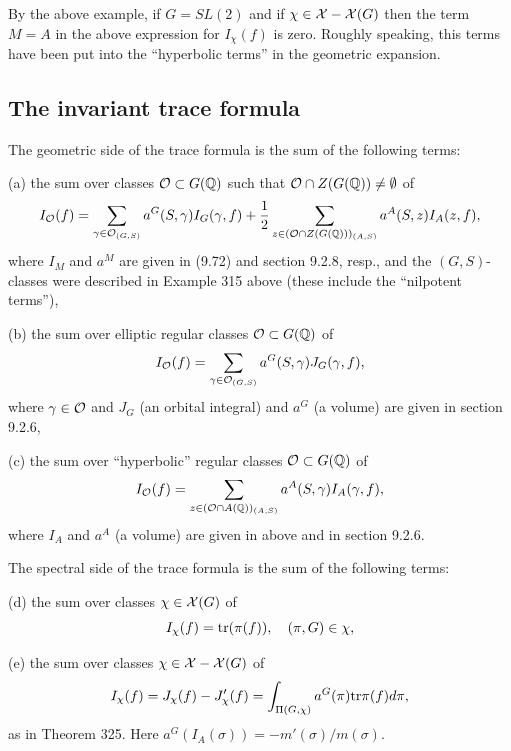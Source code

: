 By the above example, if $G=SL(2)$ and if
$\chi\in {\cal X}-{\cal X}(G)$ then the term $M=A$ in
the above expression for $I_\chi (f)$ is zero. Roughly speaking,
this terms have been put into the ``hyperbolic terms'' in
the geometric expansion.
 
\subsection{The invariant trace formula}

The geometric side of the trace formula is the sum of the following terms:

(a) the sum over classes ${\cal{O}}\subset G({\Bbb{Q}})$
such that ${\cal{O}}\cap Z(G({\Bbb{Q}}))
\not= \emptyset$ of
\begin{equation}
I_{\cal{O}}(f)=\sum_{\gamma\in {\cal{O}}_{(G,S)}}
a^G(S,\gamma)I_G(\gamma,f)
+{1\over 2}\sum_{z\in ({\cal{O}}\cap Z(G({\Bbb{Q}})))_{(A,S)}}
a^A(S,z)I_A(z,f),
\end{equation}
where $I_M$ and $a^M$ are given in (9.72) and section 9.2.8,
resp., and the $(G,S)$-classes were described in Example 315
above (these include the ``nilpotent terms''),

(b) the sum over elliptic regular classes 
${\cal{O}}\subset G({\Bbb{Q}})$
of
\begin{equation}
I_{\cal{O}}(f)=
\sum_{\gamma\in {\cal{O}}_{(G,S)}}
a^G(S,\gamma)J_G(\gamma,f),
\end{equation}
where $\gamma\in {\cal{O}}$ and
$J_G$ (an orbital integral) and $a^G$ (a volume)
are given in section 9.2.6,

(c) the sum over ``hyperbolic'' regular classes
${\cal{O}}\subset G({\Bbb{Q}})$
of
\begin{equation}
I_{\cal{O}}(f)=
\sum_{z\in ({\cal{O}}\cap A({\Bbb{Q}}))_{(A,S)}}
a^A(S,\gamma)I_A(\gamma,f),
\end{equation}
where $I_A$ and $a^A$ (a volume)
are given in above and in section 9.2.6.

The spectral side of the trace formula is the sum of the following terms:

(d) the sum over classes $\chi\in {\cal{X}}(G)$ of
\begin{equation}
I_\chi(f)=
{\rm tr}(\pi(f)),\ \ \ (\pi,G)\in\chi,
\end{equation}

(e) the sum over classes $\chi\in {\cal{X}}-{\cal{X}}(G)$ of
\begin{equation}
I_\chi(f)=J_\chi(f)-J'_\chi(f)
=\int_{\Pi (G,\chi)}a^G(\pi ){\rm tr}\pi (f)d\pi ,
\end{equation}
as in Theorem 325. Here $a^G(I_A(\sigma))=-m'(\sigma)/m(\sigma)$.




